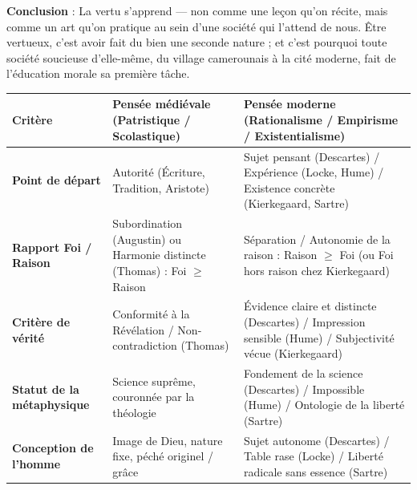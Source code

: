 \documentclass[11pt]{article}
\begin{document}
\begin{exoresolu}
\textbf{Conclusion} : La vertu s'apprend — non comme une leçon qu'on récite, mais comme un art qu'on pratique au sein d'une société qui l'attend de nous. Être vertueux, c'est avoir fait du bien une seconde nature ; et c'est pourquoi toute société soucieuse d'elle-même, du village camerounais à la cité moderne, fait de l'éducation morale sa première tâche.
\end{exoresolu}

\begin{center}
\begin{tabularx}{\linewidth}{|l|X|X|}
\hline
\rowcolor{popblueL}
\textbf{Critère} & \textbf{Pensée médiévale (Patristique / Scolastique)} & \textbf{Pensée moderne (Rationalisme / Empirisme / Existentialisme)} \\
\hline
\textbf{Point de départ} & Autorité (Écriture, Tradition, Aristote) & Sujet pensant (Descartes) / Expérience (Locke, Hume) / Existence concrète (Kierkegaard, Sartre) \\
\hline
\textbf{Rapport Foi / Raison} & Subordination (Augustin) ou Harmonie distincte (Thomas) : Foi $\ge$ Raison & Séparation / Autonomie de la raison : Raison $\ge$ Foi (ou Foi hors raison chez Kierkegaard) \\
\hline
\textbf{Critère de vérité} & Conformité à la Révélation / Non-contradiction (Thomas) & Évidence claire et distincte (Descartes) / Impression sensible (Hume) / Subjectivité vécue (Kierkegaard) \\
\hline
\textbf{Statut de la métaphysique} & Science suprême, couronnée par la théologie & Fondement de la science (Descartes) / Impossible (Hume) / Ontologie de la liberté (Sartre) \\
\hline
\textbf{Conception de l'homme} & Image de Dieu, nature fixe, péché originel / grâce & Sujet autonome (Descartes) / Table rase (Locke) / Liberté radicale sans essence (Sartre) \\
\hline
\end{tabularx}
\end{center}
\end{document}
